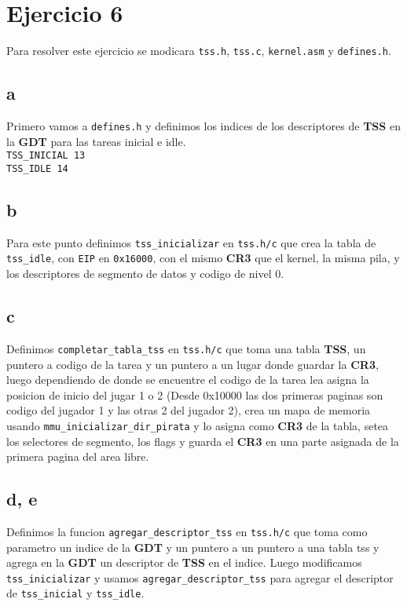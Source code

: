 \section{Ejercicio 6}

Para resolver este ejercicio se modicara \texttt{tss.h}, \texttt{tss.c}, \texttt{kernel.asm} y \texttt{defines.h}.

\subsection{a}
Primero vamos a \texttt{defines.h} y definimos los indices de los descriptores de \textbf{TSS} en la \textbf{GDT} para las tareas inicial e idle. \\
\texttt{TSS\_INICIAL	13} \\
\texttt{TSS\_IDLE		14}

\subsection{b}
Para este punto definimos \texttt{tss\_inicializar} en \texttt{tss.h/c} que crea la tabla de \texttt{tss\_idle}, con \texttt{EIP} en \texttt{0x16000}, con el mismo \textbf{CR3} que el kernel, la misma pila, y los descriptores de segmento de datos y codigo de nivel 0.

\subsection{c}
Definimos \texttt{completar\_tabla\_tss} en \texttt{tss.h/c} que toma una tabla \textbf{TSS}, un puntero a codigo de la tarea y un puntero a un lugar donde guardar la \textbf{CR3}, luego dependiendo de donde se encuentre el codigo de la tarea lea asigna la posicion de inicio del jugar 1 o 2 (Desde 0x10000 las dos primeras paginas son codigo del jugador 1 y las otras 2 del jugador 2), crea un mapa de memoria usando \texttt{mmu\_inicializar\_dir\_pirata} y lo asigna como \textbf{CR3} de la tabla, setea los selectores de segmento, los flags y guarda el \textbf{CR3} en una parte asignada de la primera pagina del area libre.

\subsection{d, e}
Definimos la funcion \texttt{agregar\_descriptor\_tss} en \texttt{tss.h/c} que toma como parametro un indice de la \textbf{GDT} y un puntero a un puntero a una tabla tss y agrega en la \textbf{GDT} un descriptor de \textbf{TSS} en el indice.
Luego modificamos \texttt{tss\_inicializar} y usamos \texttt{agregar\_descriptor\_tss} para agregar el descriptor de \texttt{tss\_inicial} y \texttt{tss\_idle}.


